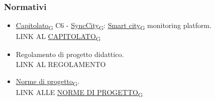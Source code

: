     \subsubsection{Normativi}
    \begin{itemize}
        \item \href{https://7last.github.io/docs/rtb/documentazione-interna/glossario#capitolato}{Capitolato\textsubscript{G}} C6 - \href{https://7last.github.io/docs/rtb/documentazione-interna/glossario#synccity}{SyncCity\textsubscript{G}}: \href{https://7last.github.io/docs/rtb/documentazione-interna/glossario#smart-city}{Smart city\textsubscript{G}} monitoring platform.\\
        LINK AL \href{https://7last.github.io/docs/rtb/documentazione-interna/glossario#capitolato}{CAPITOLATO\textsubscript{G}}
        \item Regolamento di progetto didattico.\\
        LINK AL REGOLAMENTO
        \item \href{https://7last.github.io/docs/rtb/documentazione-interna/glossario#norme-di-progetto}{Norme di progetto\textsubscript{G}}.\\
        LINK ALLE \href{https://7last.github.io/docs/rtb/documentazione-interna/glossario#norme-di-progetto}{NORME DI PROGETTO\textsubscript{G}}
    \end{itemize}
        
       

